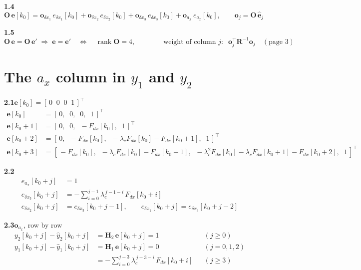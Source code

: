 \documentclass[11pt,a4paper]{ctexart}
\newcommand{\lc}{\lambda_c}
\begin{document}
\textbf{1.4}
\[
\mathbf{O}\,\mathbf{e}[k_0] = \mathbf{o}_{\delta x_1}\, e_{\delta x_1}[k_0] + \mathbf{o}_{\delta x_2}\, e_{\delta x_2}[k_0] + \mathbf{o}_{\delta x_3}\, e_{\delta x_3}[k_0] + \mathbf{o}_{a_x}\, e_{a_x}[k_0],
\qquad \mathbf{o}_j = \mathbf{O}\,\hat{\mathbf{e}}_j
\]

\textbf{1.5}
\[
\mathbf{O}\,\mathbf{e} = \mathbf{O}\,\mathbf{e}' \;\Rightarrow\; \mathbf{e} = \mathbf{e}' \quad\Leftrightarrow\quad \operatorname{rank}\mathbf{O} = 4,
\qquad\qquad
\text{weight of column } j:\;\; \mathbf{o}_j^{\top}\mathbf{R}^{-1}\mathbf{o}_j \quad (\text{page } 3)
\]

\clearpage
\section{The $a_x$ column in $y_1$ and $y_2$}

\textbf{2.1}\quad $\mathbf{e}[k_0] = [\,0\;\;0\;\;0\;\;1\,]^{\top}$
\[
\begin{aligned}
\mathbf{e}[k_0]   &= [\,0,\;\; 0,\;\; 0,\;\; 1\,]^{\top} \\
\mathbf{e}[k_0+1] &= [\,0,\;\; 0,\;\; -F_{dx}[k_0],\;\; 1\,]^{\top} \\
\mathbf{e}[k_0+2] &= [\,0,\;\; -F_{dx}[k_0],\;\; -\lc F_{dx}[k_0] - F_{dx}[k_0+1],\;\; 1\,]^{\top} \\
\mathbf{e}[k_0+3] &= [\,-F_{dx}[k_0],\;\; -\lc F_{dx}[k_0] - F_{dx}[k_0+1],\;\; -\lc^2 F_{dx}[k_0] - \lc F_{dx}[k_0+1] - F_{dx}[k_0+2],\;\; 1\,]^{\top}
\end{aligned}
\]

\textbf{2.2}
\[
\begin{aligned}
e_{a_x}[k_0+j] &= 1 \\
e_{\delta x_3}[k_0+j] &= -\sum_{i=0}^{j-1} \lc^{\,j-1-i}\,F_{dx}[k_0+i] \\
e_{\delta x_2}[k_0+j] &= e_{\delta x_3}[k_0+j-1], \qquad e_{\delta x_1}[k_0+j] = e_{\delta x_3}[k_0+j-2]
\end{aligned}
\]

\textbf{2.3}\quad $\mathbf{o}_{a_x}$, row by row
\[
\begin{aligned}
y_2[k_0+j] - \hat y_2[k_0+j] &= \mathbf{H}_2\,\mathbf{e}[k_0+j] = 1 & &(j \ge 0) \\
y_1[k_0+j] - \hat y_1[k_0+j] &= \mathbf{H}_1\,\mathbf{e}[k_0+j] = 0 & &(j = 0, 1, 2) \\
&= -\sum_{i=0}^{j-3} \lc^{\,j-3-i}\,F_{dx}[k_0+i] & &(j \ge 3)
\end{aligned}
\]
\end{document}
